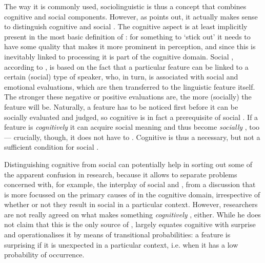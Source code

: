 The way it is commonly used, sociolinguistic  is thus a concept that combines cognitive and social components.
However, as \textcite[cf.][11]{racz2013} points out, it actually makes sense to distinguish cognitive and social .
The cognitive aspect is at least implicitly present in the most basic definition of : for something to `stick out' it needs to have some quality that makes it more prominent in perception, and since this is inevitably linked to processing it is part of the cognitive domain.
Social , according to \textcite[cf.][10]{auer2014}, is based on the fact that a particular feature can be linked to a certain (social) type of speaker, who, in turn, is associated with social and emotional evaluations, which are then transferred to the linguistic feature itself.
The stronger these negative or positive evaluations are, the more (socially)  the feature will be.
Naturally, a feature has to be noticed first before it can be socially evaluated and judged, so cognitive  is in fact a prerequisite of social .
If a feature is \emph{cognitively}  it can acquire social meaning and thus become \emph{socially} , too --- crucially, though, it does not have to \parencite[cf.][11]{racz2013}.
Cognitive  is thus a necessary, but not a sufficient condition for social .

Distinguishing cognitive from social  can potentially help in sorting out some of the apparent confusion in  research, because it allows to separate problems concerned with, for example, the interplay of social  and , from a discussion that is more focussed on the primary causes of  in the cognitive domain, irrespective of whether or not they result in social  in a particular context.
However, researchers are not really agreed on what makes something \emph{cognitively} , either.
While he does not claim that this is the only source of , \textcite[cf.][9]{racz2013} largely equates cognitive  with surprise and operationalises it by means of transitional probabilities: a feature is surprising if it is unexpected in a particular context, i.e. when it has a low probability of occurrence.

